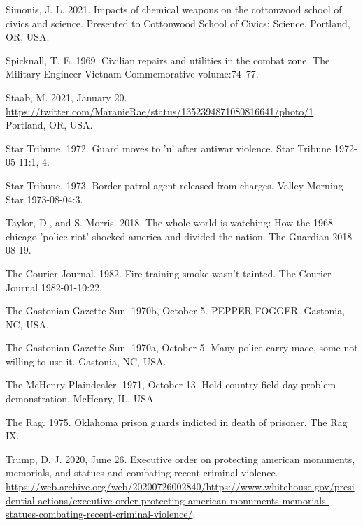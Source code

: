 \documentclass[
  11pt,
]{krantz}
\newlength{\cslhangindent}
\newenvironment{CSLReferences}[2] %
 {%
  \setlength{\parindent}{0pt}
  \ifodd #1 \everypar{\setlength{\hangindent}{\cslhangindent}}\ignorespaces\fi
  \ifnum #2 > 0
  \setlength{\parskip}{#2\baselineskip}
  \fi
 }%
 {}
\begin{document}
\begin{CSLReferences}{1}{0}
\leavevmode{}%
Simonis, J. L. 2021. Impacts of chemical weapons on the cottonwood school of civics and science. Presented to Cottonwood School of Civics; Science, Portland, OR, USA.

\leavevmode{}%
Spicknall, T. E. 1969. Civilian repairs and utilities in the combat zone. The Military Engineer Vietnam Commemorative volume:74--77.

\leavevmode{}%
Staab, M. 2021, January 20. \url{https://twitter.com/MaranieRae/status/1352394871080816641/photo/1}, Portland, OR, USA.

\leavevmode{}%
Star Tribune. 1972. Guard moves to 'u' after antiwar violence. Star Tribune 1972-05-11:1, 4.

\leavevmode{}%
Star Tribune. 1973. Border patrol agent released from charges. Valley Morning Star 1973-08-04:3.

\leavevmode{}%
Taylor, D., and S. Morris. 2018. The whole world is watching: How the 1968 chicago 'police riot' shocked america and divided the nation. The Guardian 2018-08-19.

\leavevmode{}%
The Courier-Journal. 1982. Fire-training smoke wasn't tainted. The Courier-Journal 1982-01-10:22.

\leavevmode{}%
The Gastonian Gazette Sun. 1970b, October 5. PEPPER FOGGER. Gastonia, NC, USA.

\leavevmode{}%
The Gastonian Gazette Sun. 1970a, October 5. Many police carry mace, some not willing to use it. Gastonia, NC, USA.

\leavevmode{}%
The McHenry Plaindealer. 1971, October 13. Hold country field day problem demonstration. McHenry, IL, USA.

\leavevmode{}%
The Rag. 1975. Oklahoma prison guards indicted in death of prisoner. The Rag IX.

\leavevmode{}%
Trump, D. J. 2020, June 26. Executive order on protecting american monuments, memorials, and statues and combating recent criminal violence. \url{https://web.archive.org/web/20200726002840/https://www.whitehouse.gov/presidential-actions/executive-order-protecting-american-monuments-memorials-statues-combating-recent-criminal-violence/}.


\end{CSLReferences}
\end{document}
